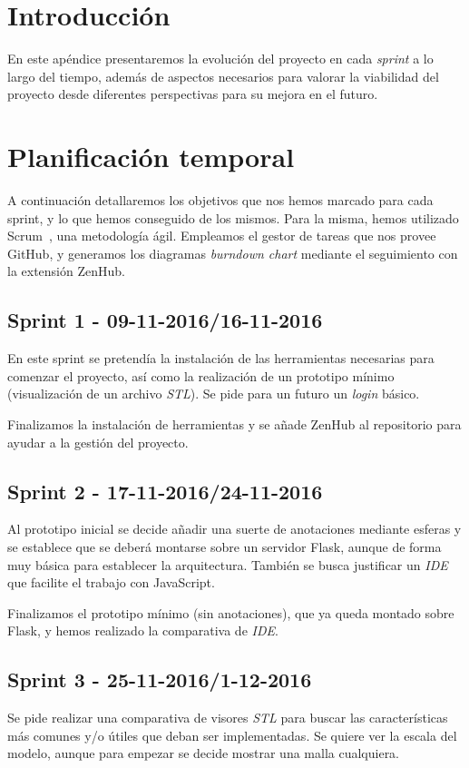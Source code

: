 
\section{Introducción}
En este apéndice presentaremos la evolución del proyecto en cada \textit{sprint} a lo largo del tiempo, además de aspectos necesarios para valorar la viabilidad del proyecto desde diferentes perspectivas para su mejora en el futuro.

\section{Planificación temporal}
A continuación detallaremos los objetivos que nos hemos marcado para cada sprint, y lo que hemos conseguido de los mismos. Para la misma, hemos utilizado Scrum~\cite{schwaber2002agile}, una metodología ágil. Empleamos el gestor de tareas que nos provee GitHub, y generamos los diagramas \textit{burndown chart} mediante el seguimiento con la extensión ZenHub.

\subsection{Sprint 1 - 09-11-2016/16-11-2016}
En este sprint se pretendía la instalación de las herramientas necesarias para comenzar el proyecto, así como la realización de un prototipo mínimo (visualización de un archivo \textit{STL}). Se pide para un futuro un \textit{login} básico.

Finalizamos la instalación de herramientas y se añade ZenHub al repositorio para ayudar a la gestión del proyecto.

\subsection{Sprint 2 - 17-11-2016/24-11-2016}
Al prototipo inicial se decide añadir una suerte de anotaciones mediante esferas y se establece que se deberá montarse sobre un servidor Flask, aunque de forma muy básica para establecer la arquitectura. También se busca justificar un \textit{IDE} que facilite el trabajo con JavaScript.

Finalizamos el prototipo mínimo (sin anotaciones), que ya queda montado sobre Flask, y hemos realizado la comparativa de \textit{IDE}.

\subsection{Sprint 3 - 25-11-2016/1-12-2016}
Se pide realizar una comparativa de visores \textit{STL} para buscar las características más comunes y/o útiles que deban ser implementadas. Se quiere ver la escala del modelo, aunque para empezar se decide mostrar una malla cualquiera.

